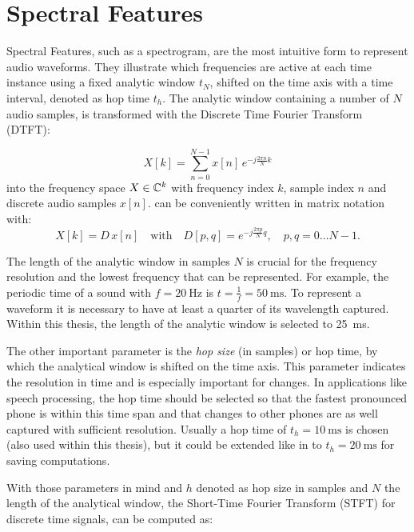 
\section{Spectral Features}\label{sec:signal_spec}
Spectral Features, such as a spectrogram, are the most intuitive form to represent audio waveforms. 
They illustrate which frequencies are active at each time instance using a fixed analytic window $t_N$, shifted on the time axis with a time interval, denoted as hop time $t_{h}$.
The analytic window containing a number of $N$ audio samples, is transformed with the Discrete Time Fourier Transform (DTFT):

\begin{equation}\label{eq:signal_spec_dtft}
    X[k] = \sum_{n=0}^{N-1} x[n] \, e^{-j\frac{2 \pi n}{N}k}
\end{equation}
into the frequency space $X \in \mathbb{C}^k$ with frequency index $k$, sample index $n$ and discrete audio samples $x[n]$.
 can be conveniently written in matrix notation with:
\begin{equation}\label{eq:signal_spec_dtft_matrix}
    X[k] = D\, x[n] \quad \mathrm{with} 
    \quad D[p, q] = e^{-j\frac{2 \pi p}{N} q},
    \quad p, q = 0 \dots N-1.
\end{equation}

The length of the analytic window in samples $N$ is crucial for the frequency resolution and the lowest frequency that can be represented.
For example, the periodic time of a sound with $f=\SI{20}{\hertz}$ is $t=\frac{1}{f} = \SI{50}{\milli\second}$.
To represent a waveform it is necessary to have at least a quarter of its wavelength captured.
Within this thesis, the length of the analytic window is selected to \SI{25}{\milli\second}.

The other important parameter is the \emph{hop size} (in samples) or hop time, by which the analytical window is shifted on the time axis.
This parameter indicates the resolution in time and is especially important for changes.
In applications like speech processing, the hop time should be selected so that the fastest pronounced phone is within this time span and that changes to other phones are as well captured with sufficient resolution.
Usually a hop time of $t_{h}=\SI{10}{\milli\second}$ is chosen (also used within this thesis), but it could be extended like in \cite{Peter2020} to $t_{h}=\SI{20}{\milli\second}$ for saving computations.

With those parameters in mind and $h$ denoted as hop size in samples and $N$ the length of the analytical window, the Short-Time Fourier Transform (STFT) for discrete time signals, can be computed as:

